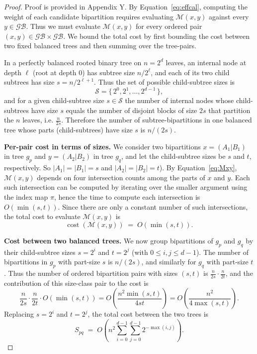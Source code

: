 \documentclass[10pt,a4paper]{article}
\newcommand{\addr}[1]{{\color{red} #1}}
\begin{document}
\begin{proof}
\addr{Proof is provided in Appendix Y}. By Equation~\eqref{eq:effcal}, computing the weight of each candidate
bipartition requires evaluating \(\mathcal{M}(x,y)\) against every
\(y\in\mathcal{GB}\). Thus we must evaluate \(\mathcal{M}(x,y)\) for
every ordered pair \((x,y)\in\mathcal{GB}\times\mathcal{GB}\). We bound
the total cost by first bounding the cost between two fixed balanced
trees and then summing over the tree-pairs.

In a perfectly balanced rooted binary tree on \(n=2^{d}\) leaves,
an internal node at depth \(\ell\) (root at depth \(0\)) has subtree
size \(n/2^{\ell}\), and each of its two child subtrees has size
\(s = n/2^{\ell+1}\). Thus the set of possible child-subtree sizes is
\[
\mathcal{S}=\{\,2^{0},2^{1},\dots,2^{d-1}\,\},
\]
and for a given child-subtree size \(s\in\mathcal{S}\) the number of
internal nodes whose child-subtrees have size \(s\) equals the number of
disjoint blocks of size \(2s\) that partition the \(n\) leaves, i.e.
\(\frac{n}{2s}\). Therefore the number of subtree-bipartitions in one balanced tree whose parts (child-subtrees) have size \(s\)
is \(n/(2s)\).

\textbf{Per-pair cost in terms of sizes.}
We consider two bipartitions \(x=(A_{1}|B_{1})\) in tree \(g_p\) and
\(y=(A_{2}|B_{2})\) in tree \(g_q\), and let the child-subtree sizes
be \(s\) and \(t\), respectively. So \(|A_{1}|=|B_{1}|=s\) and
\(|A_{2}|=|B_{2}|=t\)). By Equation~\eqref{eq:Mxy}, \(\mathcal{M}(x,y)\)
depends on four intersection counts among the parts of \(x\) and
\(y\). Each such intersection can be computed by iterating over the
smaller argument using the index map \(\pi\), hence the time to compute each intersection is \(O(\min(s,t))\). Since there are only a constant number of
such intersections, the total cost to evaluate \(\mathcal{M}(x,y)\) is
\[
\operatorname{cost}(\mathcal{M}(x,y)) \;=\; O(\min(s,t)).
\]

\textbf{Cost between two balanced trees.}
We now group bipartitions of \(g_p\) and \(g_q\) by their child-subtree sizes
\(s=2^{i}\) and \(t=2^{j}\) (with \(0\le i,j\le d-1\)). The number of
bipartitions in \(g_p\) with part-size \(s\) is \(n/(2s)\), and similarly
for \(g_q\) with part-size \(t\). Thus the number of ordered bipartition
pairs with sizes \((s,t)\) is \(\frac{n}{2s}\cdot\frac{n}{2t}\), and the
contribution of this size-class pair to the cost is
\[
\frac{n}{2s}\cdot\frac{n}{2t}\cdot O(\min(s,t))
= O\!\left(\frac{n^{2}\min(s,t)}{4st}\right)
= O\!\left(\frac{n^{2}}{4\max(s,t)}\right).
\]
Replacing \(s=2^{i}\) and \(t=2^{j}\), the total cost between the two
trees is
\[
S_{pq} \;=\; O\!\left(n^{2}\sum_{i=0}^{d-1}\sum_{j=0}^{d-1} 2^{-\max(i,j)}\right).
\]



\end{proof}
\end{document}
